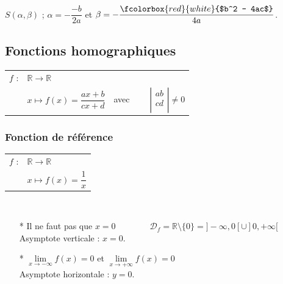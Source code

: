 $S(\alpha, \beta)$ ;  $\alpha = -\dfrac{-b}{2a}$ et $\beta = - \dfrac{\fcolorbox{red}{white}{$b^2 - 4ac$}}{4a}$.\\

\newpage

\subsection{Fonctions homographiques}


\begin{tabular}{l@{$\;$ }l@{$\qquad \qquad$}r}
  $f$ : & $ \mathbb{R} \longrightarrow \mathbb{R}$ &  \\
        & $ x \longmapsto f(x) = \dfrac{ax + b}{cx + d} $
                &  avec $ \qquad \left| \begin{array}{c}
                                           a b \\
                                           c d \\
                                          \end{array}
                                 \right|          
                                                         \neq 0$ \\  
\end{tabular}

\renewcommand{\arraystretch }{1}
\subsubsection{Fonction de référence}

\begin{tabular}{l@{$\;$ }l}
  $f$ : & $ \mathbb{R} \longrightarrow \mathbb{R}$  \\
        & $ x \longmapsto f(x) = \dfrac{1}{x}$ \\
\end{tabular}\\

\begin{itemize}
\item [*] Il ne faut pas que $x = 0 \qquad \qquad 
                    \mathscr{D}_f = \mathbb{R}\setminus\!\!\{0\} = ] -\infty,0[\cup]0, +\infty [ $ \\
                    
Asymptote verticale : $x = 0$.\\

\item[*] $\lim\limits_{x \to -\infty} f(x) = 0 $ 
        et  $\lim\limits_{x \to +\infty} f(x) = 0 $ \\
        
  Asymptote horizontale : $y = 0$.   \\         
                     
\end{itemize}

